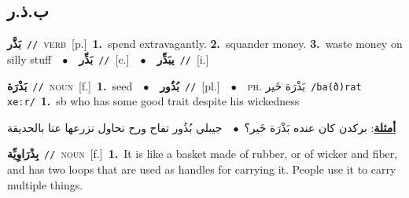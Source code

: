 \documentclass[10pt,a4paper,twoside]{article} %
\begin{document}
\begin{multicols}{2}
\vspace{-3mm}
\subsection*{\color{blue}\foreignlanguage{arabic}{ب.ذ.ر}\color{blue}{}} 

{\setlength\topsep{0pt}\textbf{\foreignlanguage{arabic}{بَذَّر}}\ {\color{gray}\texttt{//}\color{black}}\ \textsc{verb}\ [p.]\ \textbf{1.}~spend extravagantly.  \textbf{2.}~squander money.  \textbf{3.}~waste money on silly stuff\ \ $\bullet$\ \ \setlength\topsep{0pt}\textbf{\foreignlanguage{arabic}{بَذِّر}}\ {\color{gray}\texttt{//}\color{black}}\ [c.]\ \ $\bullet$\ \ \setlength\topsep{0pt}\textbf{\foreignlanguage{arabic}{يبَذِّر}}\ {\color{gray}\texttt{//}\color{black}}\ [i.]\ } \vspace{2mm}

{\setlength\topsep{0pt}\textbf{\foreignlanguage{arabic}{بَذْرَة}}\ {\color{gray}\texttt{//}\color{black}}\ \textsc{noun}\ [f.]\ \textbf{1.}~seed\ \ $\bullet$\ \ \setlength\topsep{0pt}\textbf{\foreignlanguage{arabic}{بُذُور}}\ {\color{gray}\texttt{//}\color{black}}\ [pl.]\ \ $\bullet$\ \ \textsc{ph.} \color{gray} \foreignlanguage{arabic}{بَذْرَة خَير}\color{black}\ {\color{gray}\texttt{/{\sffamily ba(ð)rat xeːr}/}\color{black}}\ \textbf{1.}~sb who has some good trait despite his wickedness\  \begin{flushright}\color{gray}\foreignlanguage{arabic}{\textbf{\underline{\foreignlanguage{arabic}{أمثلة}}}: بركدن كان عنده بَذْرَة خَير؟\ $\bullet$\ \  جيبلي بُذُور تفاح ورح نحاول نزرعها عنا بالحديقة}\end{flushright}\color{black}} \vspace{2mm}

{\setlength\topsep{0pt}\textbf{\foreignlanguage{arabic}{بِذْرَاوِيِّة}}\ {\color{gray}\texttt{//}\color{black}}\ \textsc{noun}\ [f.]\ \textbf{1.}~It is like a basket made of rubber, or of wicker and fiber, and has two loops that are used as handles for carrying it. People use it to carry multiple things.\ } \vspace{2mm}


\end{multicols}
\end{document}
